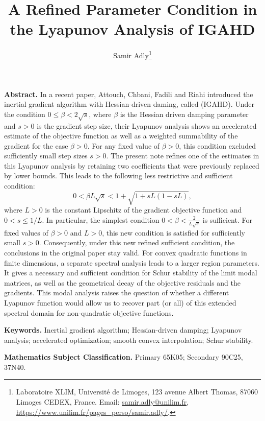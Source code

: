 \documentclass[11pt]{article}
\title{A Refined Parameter Condition in the Lyapunov Analysis of IGAHD}
\author{
Samir Adly\thanks{Laboratoire XLIM, Universit\'e de Limoges,
123 avenue Albert Thomas, 87060 Limoges CEDEX, France.
Email: \href{mailto:samir.adly@unilim.fr}{samir.adly@unilim.fr},
\url{https://www.unilim.fr/pages_perso/samir.adly/}.}
}
\date{}
\theoremstyle{plain}
\theoremstyle{definition}
\renewenvironment{abstract}
  {\par\smallskip\small\noindent\textbf{Abstract. }\ignorespaces}
  {\par\medskip}
\begin{document}
\maketitle
\vskip -8mm
\begin{abstract} In a recent paper, Attouch, Chbani, Fadili and Riahi introduced the inertial gradient algorithm with Hessian-driven daming, called (IGAHD). Under the condition $0\leq\beta<2\sqrt{s}$, where $\beta$ is the Hessian driven damping parameter and $s>0$ is the gradient step size, their Lyapunov analysis shows an accelerated estimate of the objective function as well as a weighted summability of the gradient for the case $\beta>0$. For any fixed value of $\beta>0$, this condition excluded sufficiently small step sizes $s>0$. The present note refines one of the estimates in this Lyapunov analysis by retaining two coefficients that were previously replaced by lower bounds. This leads to the following less restrictive and sufficient condition:
$$0<\beta L\sqrt{s}<1+\sqrt{1+sL(1-sL)},$$
where $L>0$ is the constant Lipschitz of the gradient objective function and $0<s\leq1/L$. In particular, the simplest condition $0<\beta <\frac{2}{L\sqrt{s}}$ is sufficient. For fixed values of $\beta>0$ and $L>0$, this new condition is satisfied for sufficiently small $s>0$. Consequently, under this new refined sufficient condition, the conclusions in the original paper stay valid. 
For convex quadratic functions in finite dimensions, a separate spectral analysis leads to a larger region parameters. It gives a necessary and sufficient condition for Schur stability of the limit modal matrices, as well as the geometrical decay of the objective residuals and the gradients. This modal analysis raises the question of whether a different Lyapunov function would allow us to recover part (or all) of this extended spectral domain for non-quadratic objective functions.
\end{abstract}

\noindent\textbf{Keywords.} Inertial gradient algorithm; Hessian-driven damping; Lyapunov analysis; accelerated optimization; smooth convex interpolation; Schur stability.

\noindent\textbf{Mathematics Subject Classification.}
Primary 65K05; Secondary 90C25, 37N40.

\tableofcontents
\end{document}

